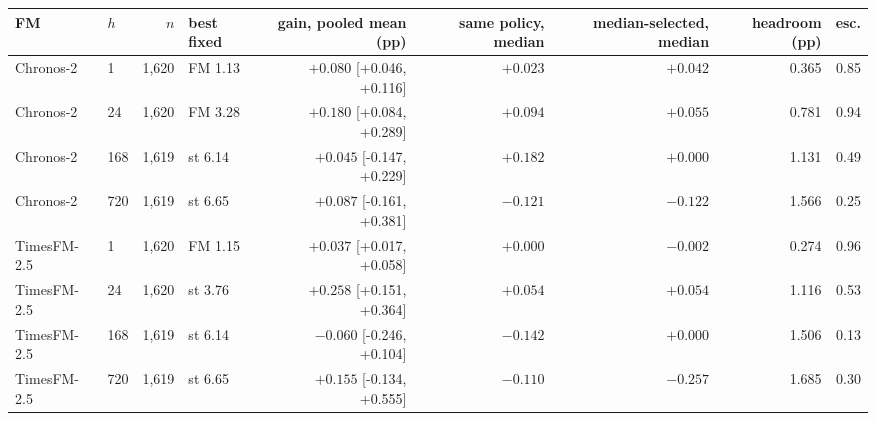 \begin{tabular}{llrlrrrrr}
\toprule
FM & $h$ & $n$ & best fixed & gain, pooled mean (pp) & same policy, median & median-selected, median & headroom (pp) & esc. \\
\midrule
Chronos-2 & 1 & 1,620 & FM 1.13 & $+0.080$ [+0.046, +0.116] & $+0.023$ & $+0.042$ & 0.365 & 0.85 \\
Chronos-2 & 24 & 1,620 & FM 3.28 & $+0.180$ [+0.084, +0.289] & $+0.094$ & $+0.055$ & 0.781 & 0.94 \\
Chronos-2 & 168 & 1,619 & st 6.14 & $+0.045$ [-0.147, +0.229] & $+0.182$ & $+0.000$ & 1.131 & 0.49 \\
Chronos-2 & 720 & 1,619 & st 6.65 & $+0.087$ [-0.161, +0.381] & $-0.121$ & $-0.122$ & 1.566 & 0.25 \\
TimesFM-2.5 & 1 & 1,620 & FM 1.15 & $+0.037$ [+0.017, +0.058] & $+0.000$ & $-0.002$ & 0.274 & 0.96 \\
TimesFM-2.5 & 24 & 1,620 & st 3.76 & $+0.258$ [+0.151, +0.364] & $+0.054$ & $+0.054$ & 1.116 & 0.53 \\
TimesFM-2.5 & 168 & 1,619 & st 6.14 & $-0.060$ [-0.246, +0.104] & $-0.142$ & $+0.000$ & 1.506 & 0.13 \\
TimesFM-2.5 & 720 & 1,619 & st 6.65 & $+0.155$ [-0.134, +0.555] & $-0.110$ & $-0.257$ & 1.685 & 0.30 \\
\bottomrule
\end{tabular}
